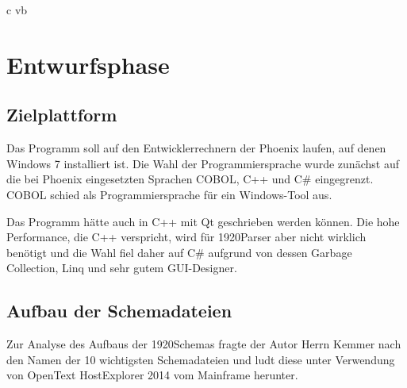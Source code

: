 c vb%
\section{Entwurfsphase} 
\label{sec:Entwurfsphase}

\subsection{Zielplattform}
\label{sec:Zielplattform}
Das Programm soll auf den Entwicklerrechnern der Phoenix laufen, auf denen  Windows 7 installiert ist.
Die Wahl der Programmiersprache wurde zunächst auf die bei Phoenix eingesetzten Sprachen COBOL, C++ und C\# eingegrenzt. COBOL schied als Programmiersprache für ein Windows-Tool aus.

Das Programm hätte auch in C++ mit Qt geschrieben werden können. Die hohe Performance, die C++ verspricht, wird für 1920Parser aber nicht wirklich benötigt und die Wahl fiel daher auf C\# aufgrund von dessen Garbage Collection, Linq und sehr gutem GUI-Designer.

\subsection{Aufbau der Schemadateien}
\label{sec:AufbauSchemas}
Zur Analyse des Aufbaus der 1920Schemas fragte der Autor Herrn Kemmer nach den Namen der 10 wichtigsten Schemadateien und ludt diese unter Verwendung von OpenText HostExplorer 2014 vom Mainframe herunter.

